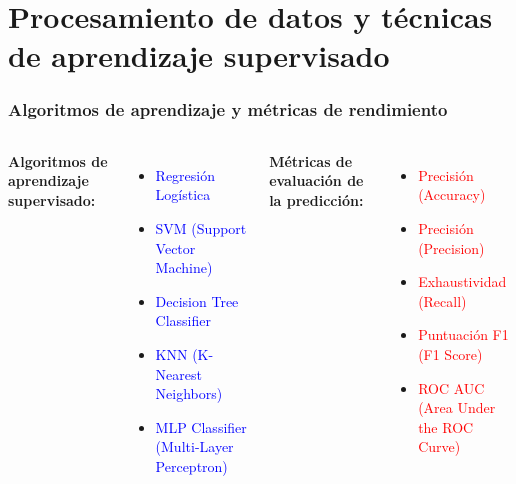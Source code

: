 \documentclass{beamer}
\begin{document}
\section{Procesamiento de datos y técnicas  de aprendizaje supervisado}
\begin{frame}
	\frametitle{Algoritmos de aprendizaje y métricas de rendimiento}
	
\begin{columns}[t]
	\textbf{Algoritmos de aprendizaje supervisado:}
	\begin{itemize}
		\item \textcolor{blue}{Regresión Logística}
		\item \textcolor{blue}{SVM (Support Vector Machine)}
		\item \textcolor{blue}{Decision Tree Classifier}
		\item \textcolor{blue}{KNN (K-Nearest Neighbors)}
		\item \textcolor{blue}{MLP Classifier (Multi-Layer Perceptron)}
	\end{itemize}
	
	\textbf{Métricas de evaluación de la predicción:}
	\begin{itemize}
		\item \textcolor{red}{Precisión (Accuracy)}
		\item \textcolor{red}{Precisión (Precision)}
		\item \textcolor{red}{Exhaustividad (Recall)}
		\item \textcolor{red}{Puntuación F1 (F1 Score)}
		\item \textcolor{red}{ROC AUC (Area Under the ROC Curve)}
	\end{itemize}
	
\end{columns}
	
\end{frame}
%
%	
\end{document}
